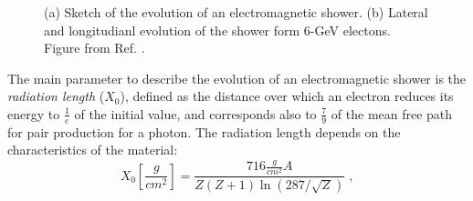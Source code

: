 \begin{figure}[ht]
\centering
{}
\caption{(a) Sketch of the evolution of an electromagnetic shower. (b) Lateral and longitudianl evolution of the shower form 6-GeV electons. Figure from Ref. \cite{grupen_shwartz_2008}.}
\label{fig:det:shower_elec}
\end{figure}


The main parameter to describe the evolution of an electromagnetic shower is the \textit{radiation length} ($X_0$), defined as the distance over which an electron reduces its energy to $\frac{1}{e}$ of the initial value, and corresponds also to $\frac{7}{9}$ of the mean free path for pair production for a photon. The radiation length depends on the characteristics of the material:
\begin{equation}
X_0 [\frac{g}{cm^2}] = \frac{716 \frac{g}{ cm^2} A }{Z(Z+1) \ln\left(287/\sqrt{Z}\right)} \; ,
\end{equation}

